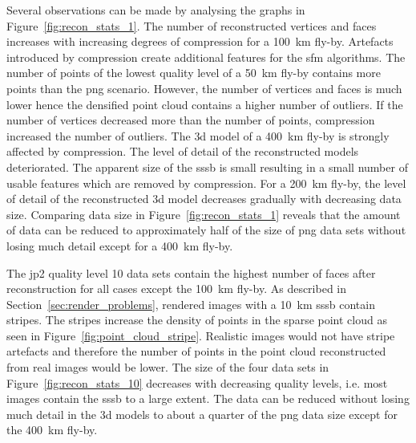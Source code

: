 Several observations can be made by analysing the graphs in Figure~\ref{fig:recon_stats_1}. The number of reconstructed vertices and faces increases with increasing degrees of compression for a \SI{100}{\kilo\meter} fly-by. Artefacts introduced by compression create additional features for the \gls{sfm} algorithms. The number of points of the lowest quality level of a \SI{50}{\kilo\meter} fly-by contains more points than the \gls{png} scenario. However, the number of vertices and faces is much lower hence the densified point cloud contains a higher number of outliers. If the number of vertices decreased more than the number of points, compression increased the number of outliers. The \gls{3d} model of a \SI{400}{\kilo\meter} fly-by is strongly affected by compression. The level of detail of the reconstructed models deteriorated. The apparent size of the \gls{sssb} is small resulting in a small number of usable features which are removed by compression. For a \SI{200}{\kilo\meter} fly-by, the level of detail of the reconstructed \gls{3d} model decreases gradually with decreasing data size. Comparing data size in Figure~\ref{fig:recon_stats_1} reveals that the amount of data can be reduced to approximately half of the size of \gls{png} data sets without losing much detail except for a \SI{400}{\kilo\meter} fly-by.

The \gls{jp2} quality level 10 data sets contain the highest number of faces after reconstruction for all cases except the \SI{100}{\kilo\meter} fly-by. As described in Section~\ref{sec:render_problems}, rendered images with a \SI{10}{\kilo\meter} \gls{sssb} contain stripes. The stripes increase the density of points in the sparse point cloud as seen in Figure~\ref{fig:point_cloud_stripe}. Realistic images would not have stripe artefacts and therefore the number of points in the point cloud reconstructed from real images would be lower. The size of the four data sets in Figure~\ref{fig:recon_stats_10} decreases with decreasing quality levels, i.e. most images contain the \gls{sssb} to a large extent. The data can be reduced without losing much detail in the \gls{3d} models to about a quarter of the \gls{png} data size except for the \SI{400}{\kilo\meter} fly-by.


